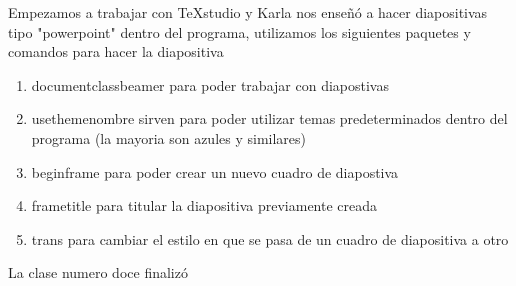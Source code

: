 \documentclass[letterpaper, 12pt, oneside]{article}%
\begin{document}
Empezamos a trabajar con TeXstudio y Karla nos enseñó a hacer diapositivas tipo "powerpoint" dentro del programa, utilizamos los siguientes paquetes y comandos para hacer la diapositiva
\begin{enumerate}
\item \color{green} documentclass{beamer} \color{orange} para poder trabajar con diapostivas \color{black}
\item \color{green} usetheme{nombre} \color{orange} sirven para poder utilizar temas predeterminados dentro del programa (la mayoria son azules y similares) \color{black}
\item \color{green} begin{frame} \color{orange} para poder crear un nuevo cuadro de diapostiva \color{black}
\item \color{green} frametitle \color{orange} para titular la diapositiva previamente creada \color{black}
\item \color{green} trans \color{orange} para cambiar el estilo en que se pasa de un cuadro de diapositiva a otro \color{black}
\end{enumerate}
La clase numero doce finalizó
\end{document}
